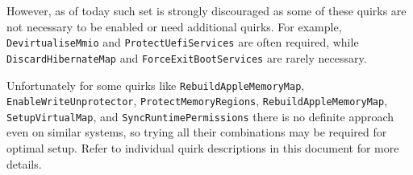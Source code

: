 \documentclass[]{article}
\begin{document}
\begin{enumerate}
  However, as of today such set is strongly discouraged as some of these quirks
  are not necessary to be enabled or need additional quirks. For example,
  \texttt{DevirtualiseMmio} and \texttt{ProtectUefiServices} are often required,
  while \texttt{DiscardHibernateMap} and \texttt{ForceExitBootServices} are rarely
  necessary.

  Unfortunately for some quirks like \texttt{RebuildAppleMemoryMap},
  \texttt{EnableWriteUnprotector}, \texttt{ProtectMemoryRegions},
  \texttt{RebuildAppleMemoryMap}, \texttt{SetupVirtualMap},
  and \texttt{SyncRuntimePermissions} there is no definite approach even on similar
  systems, so trying all their combinations may be required for optimal setup.
  Refer to individual quirk descriptions in this document for more details.

\end{enumerate}
\end{document}
